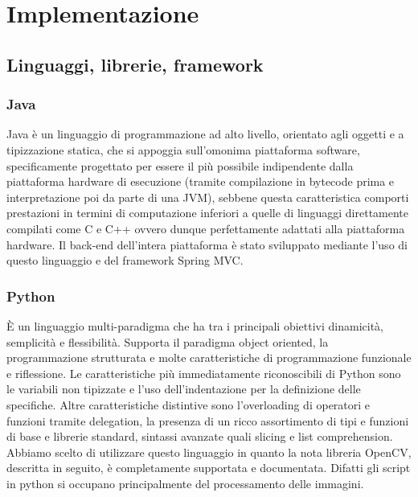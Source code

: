 \documentclass[twoside]{supsistudent}
\begin{document}
\chapter{Implementazione}
\section{Linguaggi, librerie, framework}
\subsection{Java}
Java è un linguaggio di programmazione ad alto livello, orientato agli 
oggetti e a tipizzazione statica, che si appoggia sull'omonima piattaforma software, 
specificamente progettato per essere il più possibile indipendente dalla piattaforma 
hardware di esecuzione (tramite compilazione in bytecode prima e interpretazione poi 
da parte di una JVM), sebbene questa caratteristica comporti prestazioni in termini 
di computazione inferiori a quelle di linguaggi direttamente compilati come C e C++ 
ovvero dunque perfettamente adattati alla piattaforma hardware.
Il back-end dell'intera piattaforma è stato sviluppato mediante l'uso di questo linguaggio e 
del framework Spring MVC.
\subsection{Python}
È un linguaggio multi-paradigma che ha tra i principali obiettivi dinamicità, semplicità
e flessibilità. Supporta il paradigma object oriented, la programmazione strutturata e 
molte caratteristiche di programmazione funzionale e riflessione. Le caratteristiche più 
immediatamente riconoscibili di Python sono le variabili non tipizzate e l'uso 
dell'indentazione per la definizione delle specifiche. Altre caratteristiche distintive 
sono l'overloading di operatori e funzioni tramite delegation, la presenza di un 
ricco assortimento di tipi e funzioni di base e librerie standard, sintassi avanzate 
quali slicing e list comprehension.
Abbiamo scelto di utilizzare questo linguaggio in quanto la nota libreria OpenCV, descritta in 
seguito, è completamente supportata e documentata. Difatti gli script in python si occupano 
principalmente del processamento delle immagini. 
\end{document}
